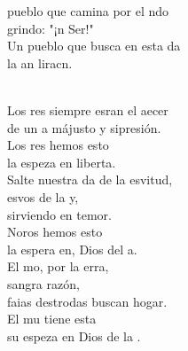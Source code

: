 \documentclass[12pt]{article}
\begin{document}
\begin{multicols*}{2}
\begin{cancion}%
	\begin{chorus}%
	pueblo que camina por el ndo\\
	grindo: "¡n Ser!" \\
	Un pueblo que busca en esta da\\
	la an liracn.\\
	\end{chorus}%
	\jump\\
	Los res siempre esran el aecer\\
	de un a májusto y sipresión.\\
	Los res hemos esto \\
	la espeza en  liberta.\\
\jump
	Salte nuestra da de la esvitud,\\
	esvos de la y, \\
	sirviendo en temor.\\
	Noros hemos esto \\
	la espera en, Dios del a.\\
\jump
	El mo, por la erra, \\
	sangra  razón,\\
	faias destrodas buscan hogar.\\
	El mu tiene esta \\
	su espeza en  Dios de la .\\
\end{cancion}%


\end{multicols*}
\end{document}
